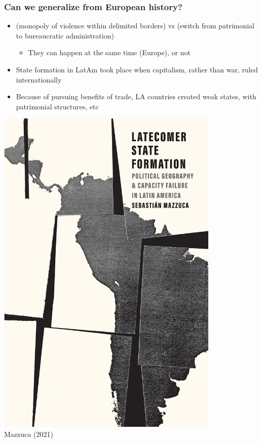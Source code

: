\documentclass[aspectratio=43]{beamer}
\begin{document}
\begin{frame}
\frametitle{Can we generalize from European history?}
\centering

\begin{minipage}{0.6\textwidth}\centering
  \begin{itemize}
    \item<2->  (monopoly of violence within delimited borders) vs  (switch from patrimonial to bureaucratic administration)
    \begin{itemize}
      \item They can happen at the same time (Europe), or not
    \end{itemize}
    \item<3-> State formation in LatAm took place when capitalism, rather than war, ruled internationally
    \item<3-> Because of pursuing benefits of trade, LA countries created weak states, with patrimonial structures, etc
  \end{itemize}
\end{minipage}\hfill
\begin{minipage}{0.4\textwidth}\centering
  \includegraphics[width = 0.8\textwidth]{img/mazzuca_book}\\
  {\small Mazzuca (2021)}
\end{minipage}

\end{frame}
\end{document}
